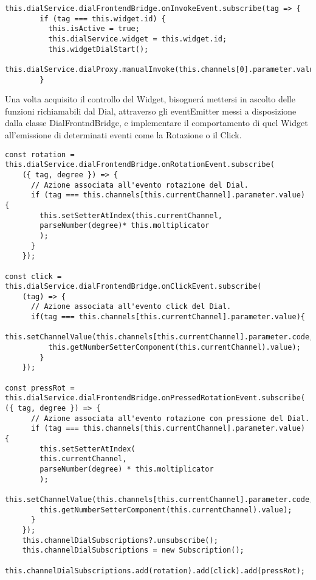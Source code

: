 \vspace{1.0cm}
\begin{lstlisting}[caption={Ascolto Invoke della voce di menu'},style=javaScriptCode]
  this.dialService.dialFrontendBridge.onInvokeEvent.subscribe(tag => {
        if (tag === this.widget.id) {
          this.isActive = true;
          this.dialService.widget = this.widget.id;
          this.widgetDialStart();
          this.dialService.dialProxy.manualInvoke(this.channels[0].parameter.value);
        }
\end{lstlisting} 
\vspace{1.0cm}

Una volta acquisito il controllo del Widget, bisognerá mettersi in ascolto delle funzioni richiamabili dal Dial, attraverso gli eventEmitter messi a disposizione dalla classe DialFrontndBridge, e implementare il comportamento di quel Widget all’emissione di determinati eventi come la Rotazione o il Click.


\vspace{1.0cm}
\begin{lstlisting}[caption={Ascolto eventi associati alla voce di menu' selezionata},style=javaScriptCode]
const rotation = this.dialService.dialFrontendBridge.onRotationEvent.subscribe(
	({ tag, degree }) => {
      // Azione associata all'evento rotazione del Dial.
      if (tag === this.channels[this.currentChannel].parameter.value) {
        this.setSetterAtIndex(this.currentChannel, 
        parseNumber(degree)* this.moltiplicator
        );
      }
    });

const click = this.dialService.dialFrontendBridge.onClickEvent.subscribe(
	(tag) => {
      // Azione associata all'evento click del Dial.
      if(tag === this.channels[this.currentChannel].parameter.value){
          this.setChannelValue(this.channels[this.currentChannel].parameter.code,
          this.getNumberSetterComponent(this.currentChannel).value);
        }
    });

const pressRot = this.dialService.dialFrontendBridge.onPressedRotationEvent.subscribe(
({ tag, degree }) => {
      // Azione associata all'evento rotazione con pressione del Dial.
      if (tag === this.channels[this.currentChannel].parameter.value) {
        this.setSetterAtIndex(
        this.currentChannel, 
        parseNumber(degree) * this.moltiplicator
        );
        this.setChannelValue(this.channels[this.currentChannel].parameter.code,
        this.getNumberSetterComponent(this.currentChannel).value);
      }
    });
    this.channelDialSubscriptions?.unsubscribe();
    this.channelDialSubscriptions = new Subscription();
    this.channelDialSubscriptions.add(rotation).add(click).add(pressRot);
\end{lstlisting} 
\vspace{1.0cm}



